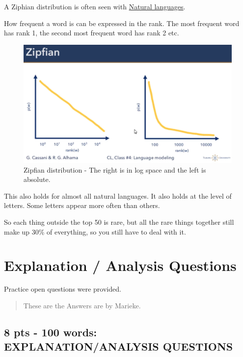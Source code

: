 \documentclass[
  11pt,
  british,
]{article}
\begin{document}
A Ziphian distribution is often seen with
\href{Natural\%20languages.md}{Natural languages}.

How frequent a word is can be expressed in the rank. The most frequent
word has rank 1, the second most frequent word has rank 2 etc.

\begin{figure}
\centering
\includegraphics{Pasted_image_20220224133421.png}
\caption{Zipfian distribution - The right is in log space and the left
is absolute.}
\end{figure}

This also holds for almost all natural languages. It also holds at the
level of letters. Some letters appear more often than others.

So each thing outside the top 50 is rare, but all the rare things
together still make up 30\% of everything, so you still have to deal
with it.

\hypertarget{explanation-analysis-questions}{%
\section{Explanation / Analysis
Questions}\label{explanation-analysis-questions}}

Practice open questions were provided.

\begin{quote}
These are the Answers are by Marieke.
\end{quote}

\hypertarget{pts---100-words-explanationanalysis-questions}{%
\subsection{8 pts - 100 words: EXPLANATION/ANALYSIS
QUESTIONS}\label{pts---100-words-explanationanalysis-questions}}
\end{document}
